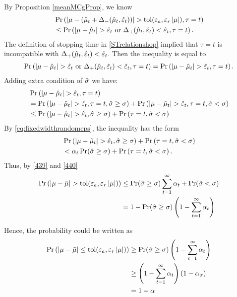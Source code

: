 \documentclass[hyperref={pdfpagelabels=false}]{beamer}
\begin{document}
{By Proposition \ref{meanMCgProp}, we know
\begin{align*}
 &\Pr \left( \left \lvert \mu-(\hat{\mu}_t+\Delta_{-}(\hat{\mu}_t,\hat{\varepsilon}_t)) \right \rvert> \operatorname{tol}(\varepsilon_a,\varepsilon_r\left \lvert \mu \right \rvert), \tau = t  \right)\\
&\leq
\Pr \left( \left \lvert \mu-\hat{\mu}_t \right \rvert>\hat{\varepsilon}_t  \text{ or } \Delta_{+}(\hat{\mu}_t,\hat{\varepsilon}_t)<\hat{\varepsilon}_t , \tau = t \right).
\end{align*}
The definition of stopping time in \eqref{STrelationshop} implied that $\tau = t$ is incompatible with $ \Delta_{+}(\hat{\mu}_t,\hat{\varepsilon}_t)<\hat{\varepsilon}_t$. Then the inequality is equal to
\begin{align*}
\Pr \left( \left \lvert \mu-\hat{\mu}_t \right \rvert> \hat{\varepsilon}_t  \text{ or } \Delta_{+}(\hat{\mu}_t,\hat{\varepsilon}_t)<\hat{\varepsilon}_t , \tau = t\right)= \Pr \left( \left \lvert \mu-\hat{\mu}_t \right \rvert> \hat{\varepsilon}_t, \tau = t \right).
\end{align*}
Adding extra condition of $\hat{\sigma}$ we have:
\begin{align*}
& \Pr \left( \left \lvert \mu-\hat{\mu}_t \right \rvert> \hat{\varepsilon}_t, \tau = t \right) \\
 &=  \Pr \left( \left \lvert \mu-\hat{\mu}_t \right \rvert> \hat{\varepsilon}_t, \tau = t , \hat{\sigma}\geq\sigma\right) + \Pr \left( \left \lvert \mu-\hat{\mu}_t \right \rvert> \hat{\varepsilon}_t, \tau = t,\hat{\sigma}<\sigma \right) \\
 & \leq \Pr \left( \left \lvert \mu-\hat{\mu}_t \right \rvert> \hat{\varepsilon}_t, \hat{\sigma}\geq\sigma\right) + \Pr \left(  \tau = t,\hat{\sigma}<\sigma \right)
\end{align*}
By \eqref{eq:fixedwidthrandomeps}, the inequality has the form
\begin{align}\label{440}
&\Pr \left( \left \lvert \mu-\hat{\mu}_t \right \rvert> \hat{\varepsilon}_t, \hat{\sigma}\geq\sigma\right) + \Pr \left(  \tau = t,\hat{\sigma}<\sigma \right) \nonumber\\
&<\alpha_t \Pr(\hat{\sigma} \geq \sigma) +\Pr \left(  \tau = t,\hat{\sigma}<\sigma \right).
\end{align}
Thus, by \eqref{439} and \eqref{440}
\begin{align*}
\Pr \left( \left \lvert \mu-\tilde{\mu} \right \rvert > \operatorname{tol}(\varepsilon_a,\varepsilon_r\left \lvert \mu \right \rvert)\right) 
&\leq \Pr(\hat{\sigma} \geq \sigma) \sum_{t=1}^\infty \alpha_t+\Pr(\hat{\sigma}<\sigma)\\
&=1-\Pr(\hat{\sigma} \geq \sigma)\left(1-\sum_{t=1}^\infty \alpha_t\right)
\end{align*}

Hence, the probability could be written as
\begin{align*}
\Pr \left( \left \lvert \mu-\tilde{\mu} \right \rvert \leq \operatorname{tol}(\varepsilon_a,\varepsilon_r\left \lvert \mu \right \rvert)\right) &\geq \Pr(\hat{\sigma} \geq \sigma)\left(1-\sum_{t=1}^\infty \alpha_t\right) \\&\geq \left(1-\sum_{t=1}^\infty \alpha_t\right) (1-\alpha_\sigma) \\&= 1-\alpha
\end{align*}
}
\end{document}
